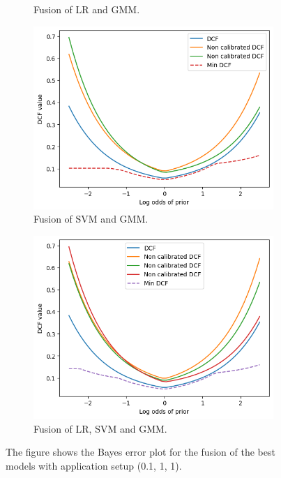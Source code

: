 \documentclass{article}
\begin{document}
\begin{figure}[ht]
\begin{subfigure}[b]{0.45\textwidth}
        \caption{Fusion of LR and GMM.}
    \end{subfigure}
    \vfill
    \begin{subfigure}[b]{0.45\textwidth}
        \centering
        \includegraphics[width=\textwidth]{images/calibration_svm_gmm_bayes_error.png}
        \caption{Fusion of SVM and GMM.}
    \end{subfigure}
    \hfill
    \begin{subfigure}[b]{0.45\textwidth}
        \centering
        \includegraphics[width=\textwidth]{images/calibration_bayes_error.png}
        \caption{Fusion of LR, SVM and GMM.}
    \end{subfigure}
    \caption{The figure shows the Bayes error plot for the fusion of the best models with application setup (0.1, 1, 1).}
    \label{fig:fusion_bayes_error}
\end{figure}
\end{document}

